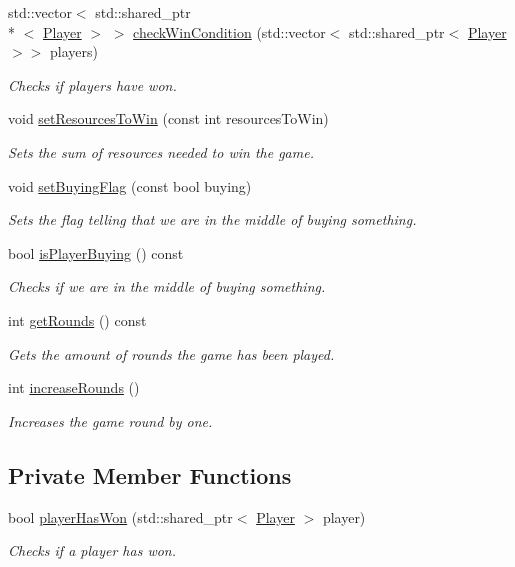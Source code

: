 \begin{DoxyCompactItemize}
std\-::vector$<$ std\-::shared\-\_\-ptr\\*
$<$ \hyperlink{classGame_1_1Player}{Player} $>$ $>$ \hyperlink{classGame_1_1GameEventHandler_a3e8a68eec25834d491e81c68a0a1a318}{check\-Win\-Condition} (std\-::vector$<$ std\-::shared\-\_\-ptr$<$ \hyperlink{classGame_1_1Player}{Player} $>$$>$ players)
\begin{DoxyCompactList}\small\item\em Checks if players have won. \end{DoxyCompactList}\item 
void \hyperlink{classGame_1_1GameEventHandler_a3ef61837daa4a8cba540986bdfdfb3a6}{set\-Resources\-To\-Win} (const int resources\-To\-Win)
\begin{DoxyCompactList}\small\item\em Sets the sum of resources needed to win the game. \end{DoxyCompactList}\item 
void \hyperlink{classGame_1_1GameEventHandler_a7e923c78df72600509dee5e292052653}{set\-Buying\-Flag} (const bool buying)
\begin{DoxyCompactList}\small\item\em Sets the flag telling that we are in the middle of buying something. \end{DoxyCompactList}\item 
bool \hyperlink{classGame_1_1GameEventHandler_a76fe6c9beff8949f31dea0f0111a508a}{is\-Player\-Buying} () const 
\begin{DoxyCompactList}\small\item\em Checks if we are in the middle of buying something. \end{DoxyCompactList}\item 
int \hyperlink{classGame_1_1GameEventHandler_ad4c9a8438df151e4c191c31b4bfdcec1}{get\-Rounds} () const 
\begin{DoxyCompactList}\small\item\em Gets the amount of rounds the game has been played. \end{DoxyCompactList}\item 
int \hyperlink{classGame_1_1GameEventHandler_a9a6af0f0397815127f8a9d07f0c1c9dc}{increase\-Rounds} ()
\begin{DoxyCompactList}\small\item\em Increases the game round by one. \end{DoxyCompactList}\end{DoxyCompactItemize}
\subsection*{Private Member Functions}
\begin{DoxyCompactItemize}
\item 
bool \hyperlink{classGame_1_1GameEventHandler_a8340221ba757fe26a656ded19f60a540}{player\-Has\-Won} (std\-::shared\-\_\-ptr$<$ \hyperlink{classGame_1_1Player}{Player} $>$ player)
\begin{DoxyCompactList}\small\item\em Checks if a player has won. \end{DoxyCompactList}\end{DoxyCompactItemize}
